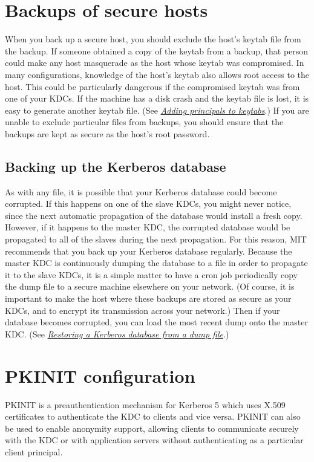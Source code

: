 \documentclass[letterpaper,10pt,english]{sphinxmanual}
\begin{document}
\chapter{Backups of secure hosts}
\label{admin/backup_host:backups-of-secure-hosts}\label{admin/backup_host::doc}
When you back up a secure host, you should exclude the host's keytab
file from the backup.  If someone obtained a copy of the keytab from a
backup, that person could make any host masquerade as the host whose
keytab was compromised.  In many configurations, knowledge of the
host's keytab also allows root access to the host.  This could be
particularly dangerous if the compromised keytab was from one of your
KDCs.  If the machine has a disk crash and the keytab file is lost, it
is easy to generate another keytab file.  (See {\hyperref[admin/appl_servers:add-princ-kt]{\emph{Adding principals to keytabs}}}.)
If you are unable to exclude particular files from backups, you should
ensure that the backups are kept as secure as the host's root
password.


\section{Backing up the Kerberos database}
\label{admin/backup_host:backing-up-the-kerberos-database}
As with any file, it is possible that your Kerberos database could
become corrupted.  If this happens on one of the slave KDCs, you might
never notice, since the next automatic propagation of the database
would install a fresh copy.  However, if it happens to the master KDC,
the corrupted database would be propagated to all of the slaves during
the next propagation.  For this reason, MIT recommends that you back
up your Kerberos database regularly.  Because the master KDC is
continuously dumping the database to a file in order to propagate it
to the slave KDCs, it is a simple matter to have a cron job
periodically copy the dump file to a secure machine elsewhere on your
network.  (Of course, it is important to make the host where these
backups are stored as secure as your KDCs, and to encrypt its
transmission across your network.)  Then if your database becomes
corrupted, you can load the most recent dump onto the master KDC.
(See {\hyperref[admin/database:restore-from-dump]{\emph{Restoring a Kerberos database from a dump file}}}.)


\chapter{PKINIT configuration}
\label{admin/pkinit:pkinit-configuration}\label{admin/pkinit:pkinit}\label{admin/pkinit::doc}
PKINIT is a preauthentication mechanism for Kerberos 5 which uses
X.509 certificates to authenticate the KDC to clients and vice versa.
PKINIT can also be used to enable anonymity support, allowing clients
to communicate securely with the KDC or with application servers
without authenticating as a particular client principal.
\end{document}
